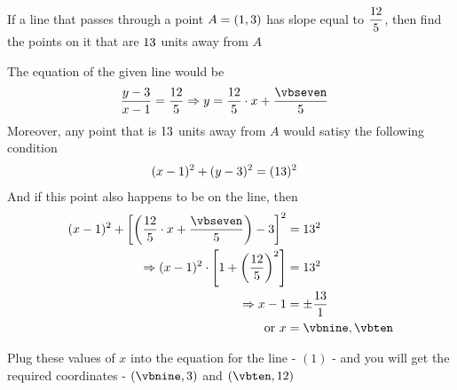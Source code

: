\renewcommand{\vbsix}{\dfrac{\vbthree}{\vbfour}}
\gcalcexpr[0]{\vbnine}{(\vbfive / \vbeight) + \vbone}
\gcalcexpr[0]{\vbten}{\vbone - (\vbfive / \vbeight)}

\question[4] If a line that passes through a point $A = (1, 3)$ has slope equal to $\vbsix$, then 
find the points on it that are $13$ units away from $A$


\watchout

\ifprintanswers
\fi 

\begin{solution}[\halfpage]
	The equation of the given line would be
	\begin{align}
		\dfrac{y-\vbtwo}{x-\vbone} &= \vbsix \Rightarrow y = \vbsix\cdot x + \dfrac{\vbseven}{\vbfour}
	\end{align}
	Moreover, any point that is $13$ units away from $A$ would satisy 
	the following condition 
	\begin{align}
		(x - 1)^2 + (y-3)^2 &= (13)^2 
	\end{align}
	And if this point also happens to be on the line, then 
	\begin{align}
		(x-\vbone)^2 + \left[ \left( \vbsix\cdot x + \dfrac{\vbseven}{\vbfour}\right) - \vbtwo \right]^2 &= \vbfive^2 \\
		\Rightarrow (x - \vbone)^2\cdot\left[ 1 + \left( \vbsix \right)^2\right] &= \vbfive^2 \\
		\Rightarrow x - \vbone &= \pm\dfrac{\vbfive}{\vbeight} \\
		\text{ or } x &= \vbnine, \vbten
	\end{align}
	
	\gcalcexpr{\vbfive}{\vbthree / \vbfour} %
    
    Plug these values of $x$ into the equation for the line - $(1)$ - and you will 
    get the required coordinates -  $(\vbnine, \vbtwo)$ and $(\vbten, \vbthree)$
\end{solution}
